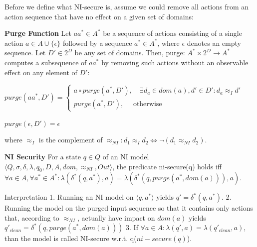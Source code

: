 \documentclass[a4paper]{article}
\renewcommand{\note}[2]{\begin{noteBox} \textbf{#1} #2 \end{noteBox}}
\begin{document}
\begin{multicols}{3}
    Before we define what NI-secure is, assume we could remove all actions from an action sequence that have no effect on a given set of domains:
    \note{Purge Function}{Let $aa^*\in A^*$ be a sequence of actions consisting of a single action $a\in A\cup\{\epsilon\}$ followed by a sequence $a^*\in A^*$, where $\epsilon$ denotes an empty sequence. Let $D'\in 2^D$ be any set of domains. Then, purge: $A^*\times 2^D \rightarrow A^*$ computes a subsequence of $aa^*$ by removing such actions without an observable effect on any element of $D':$
        \begin{itemize*}
            \item $purge(aa^*,D')=\begin{cases} a\circ purge(a^*,D'), \quad\exists d_a\in dom(a),d'\in D':d_a\approx_I d' \\ purge(a^*,D'), \quad\text{ otherwise }\end{cases}$
            \item $purge(\epsilon,D')=\epsilon$
        \end{itemize*}
        where $\approx_I$ is the complement of $\approx_{NI}:d_1 \approx_I d_2\Leftrightarrow \lnot(d_1 \approx_{NI} d_2)$.
    }

    \note{NI Security}{For a state $q\in Q$ of an NI model $⟨Q,\sigma,\delta,\lambda,q_0,D,A,dom,\approx_{NI},Out⟩$, the predicate ni-secure(q) holds iff $\forall a\in A,\forall a^*\in A^*:\lambda (\delta^*(q,a^*),a)=\lambda(\delta^*(q,purge(a^*,dom(a))),a)$.}

    Interpretation
    1. Running an NI model on $⟨q,a^*⟩$ yields $q'=\delta^*(q,a^*)$.
    2. Running the model on the purged input sequence so that it contains only actions that, according to $\approx_{NI}$, actually have impact on $dom(a)$ yields $q'_{clean}=\delta^*(q,purge(a^*,dom(a)))$
    3. If $\forall a\in A:\lambda(q',a)=\lambda(q'_{clean},a)$, than the model is called NI-secure w.r.t. q($ni-secure(q)$).


\end{multicols}
\end{document}
